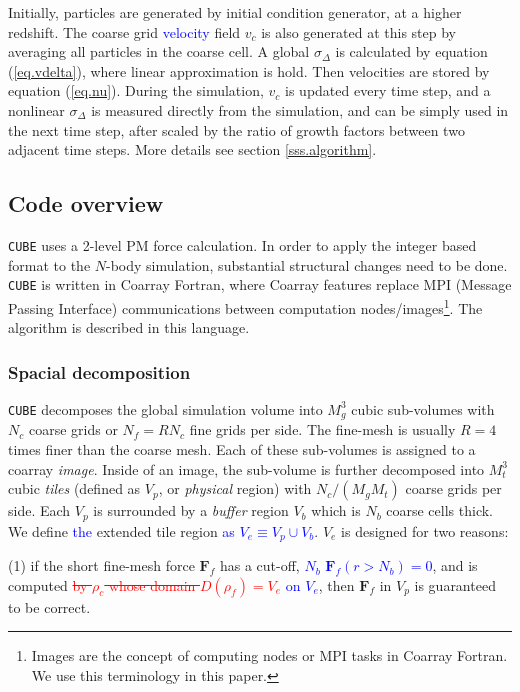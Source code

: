 \documentclass[10pt,twocolumn,preprint]{emulateapj}
\newcommand{\bs}{\boldsymbol}
\newcommand{\tcb}{\textcolor{blue}}
\newcommand{\tcr}{\textcolor{red}}
\begin{document}
Initially, particles are generated by initial condition generator, at a higher redshift. The coarse grid \tcb{velocity} field $v_c$ is also generated at this step by averaging all particles in the coarse cell. A global $\sigma_\Delta$ is calculated by equation (\ref{eq.vdelta}), where linear approximation is hold. Then velocities are stored by equation (\ref{eq.nu}). During the simulation, $v_c$ is updated every time step, and a nonlinear $\sigma_\Delta$ is measured directly from the simulation, and can be simply used in the next time step, after scaled by the ratio of growth factors between two adjacent time steps. More details see section \ref{sss.algorithm}.

\subsection{Code overview}\label{ss.overview}
{\tt CUBE} uses a 2-level PM force calculation. In order to apply the integer based format to the $N$-body simulation, substantial structural changes need to be done. {\tt CUBE} is written in Coarray Fortran, where Coarray features replace MPI (Message Passing Interface) communications between computation nodes/images\footnote{Images are the concept of computing nodes or MPI tasks in Coarray Fortran. We use this terminology in this paper.}. The algorithm is described in this language.

\subsubsection{Spacial decomposition}\label{sss.spatial_decomposition}
{\tt CUBE} decomposes the global simulation volume into $M_g^3$ cubic sub-volumes with $N_c$ coarse grids or $N_f=RN_c$ fine grids per side. The fine-mesh is usually $R=4$ times finer than the coarse mesh. Each of these sub-volumes is assigned to a coarray {\it image}. Inside of an image, the sub-volume is further decomposed into $M_t^3$ cubic {\it tiles} (defined as $V_p$, or {\it physical} region) with $N_c/(M_g M_t)$ coarse grids per side. Each $V_p$ is surrounded by a {\it buffer} region $V_b$ which is $N_b$ coarse cells thick. We define \tcb{the} extended tile region \tcb{as} \tcb{$V_e\equiv V_p\cup V_b$}. $V_e$ is designed for two reasons:

(1) if the short fine-mesh force ${\bs F}_f$ has a cut-off, \tcb{$N_b$ ${\bs F}_f(r>N_b)=0$}, and is computed \tcr{\sout{ by $\rho_c$ whose domain $D(\rho_f)=V_e$}} \tcb{on $V_e$}, then ${\bs F}_f$ in $V_p$ is guaranteed to be correct. 
\end{document}
